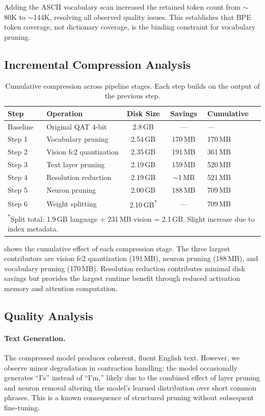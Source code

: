 \documentclass[11pt]{article}
\begin{document}
Adding the ASCII vocabulary scan increased the retained token count from $\sim$80K to $\sim$144K, resolving all observed quality issues. This establishes that BPE token coverage, not dictionary coverage, is the binding constraint for vocabulary pruning.

\subsection{Incremental Compression Analysis}

\begin{table}[t]
\centering
\caption{Cumulative compression across pipeline stages. Each step builds on the output of the previous step.}
\label{tab:incremental}
\begin{tabular}{@{}llccl@{}}
\toprule
Step & Operation & Disk Size & Savings & Cumulative \\
\midrule
Baseline & Original QAT 4-bit & 2.8\,GB & --- & --- \\
Step 1 & Vocabulary pruning & 2.54\,GB & 170\,MB & 170\,MB \\
Step 2 & Vision fc2 quantization & 2.35\,GB & 191\,MB & 361\,MB \\
Step 3 & Text layer pruning & 2.19\,GB & 159\,MB & 520\,MB \\
Step 4 & Resolution reduction & 2.19\,GB & $\sim$1\,MB & 521\,MB \\
Step 5 & Neuron pruning & 2.00\,GB & 188\,MB & 709\,MB \\
Step 6 & Weight splitting & 2.10\,GB\textsuperscript{*} & --- & 709\,MB \\
\bottomrule
\multicolumn{5}{l}{\textsuperscript{*}\footnotesize{Split total: 1.9\,GB language + 231\,MB vision = 2.1\,GB. Slight increase due to index metadata.}}
\end{tabular}
\end{table}

 shows the cumulative effect of each compression stage. The three largest contributors are vision fc2 quantization (191\,MB), neuron pruning (188\,MB), and vocabulary pruning (170\,MB). Resolution reduction contributes minimal disk savings but provides the largest runtime benefit through reduced activation memory and attention computation.

\subsection{Quality Analysis}

\paragraph{Text Generation.} The compressed model produces coherent, fluent English text. However, we observe minor degradation in contraction handling: the model occasionally generates ``I's'' instead of ``I'm,'' likely due to the combined effect of layer pruning and neuron removal altering the model's learned distribution over short common phrases. This is a known consequence of structured pruning without subsequent fine-tuning.
\end{document}
